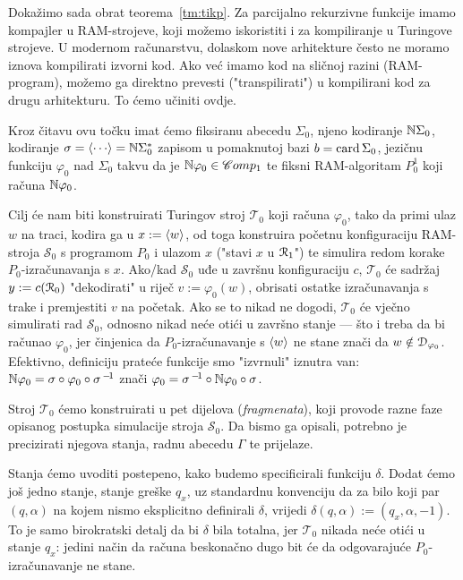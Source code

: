Dokažimo sada obrat teorema~\ref{tm:tikp}. Za parcijalno rekurzivne funkcije imamo kompajler u RAM-strojeve, koji možemo iskoristiti i za kompiliranje u Turingove strojeve. U modernom računarstvu, dolaskom nove arhitekture često ne moramo iznova kompilirati izvorni kod. Ako već imamo kod na sličnoj razini (RAM-program), možemo ga direktno prevesti ("transpilirati") u kompilirani kod za drugu arhitekturu. To ćemo učiniti ovdje.

Kroz čitavu ovu točku imat ćemo fiksiranu abecedu $\Sigma_0$, njeno kodiranje ${\mathbb N}\Sigma_0$, kodiranje $\sigma=\kr{\cdots}=\N\Sigma_0^*$ zapisom u pomaknutoj bazi $b=\operatorname{card}\Sigma_0$, jezičnu funkciju $\varphi_0$ nad $\Sigma_0$ takvu da je ${\mathbb N}\varphi_0\in\mathscr Comp_1$ te fiksni RAM-algoritam $P_0^1$ koji računa ${\mathbb N}\varphi_0$.

Cilj će nam biti konstruirati Turingov stroj $\mathcal T_0$ koji računa $\varphi_0$, tako da primi ulaz $w$ na traci, kodira ga u $x:=\langle w\rangle$, od toga konstruira početnu konfiguraciju RAM-stroja $\mathcal S_0$ s programom $P_0$ i ulazom $x$ ("\hspace{0.1pt}stavi $x$ u $\mathcal R_{1}$\!") te simulira redom korake $P_0$-izračunavanja s $x$. Ako\slash kad $\mathcal S_0$ uđe u završnu konfiguraciju $c$, $\mathcal T_0$ će sadržaj $y:=c(\mathcal R_{0})$ "dekodirati" u riječ $v:=\varphi_0(w)$, obrisati ostatke izračunavanja s trake i premjestiti $v$ na početak. Ako se to nikad ne dogodi, $\mathcal T_0$ će vječno simulirati rad $\mathcal S_0$, odnosno nikad neće otići u završno stanje --- što i treba da bi računao $\varphi_0$, jer činjenica da $P_0$-izračunavanje s $\langle w\rangle$ ne stane znači da $w\notin\mathcal D_{\varphi_0}$. Efektivno, definiciju prateće funkcije smo "izvrnuli" iznutra van: ${\mathbb N}\varphi_0=\sigma\circ\varphi_0\circ\sigma^{\,-\!1}$ znači $\varphi_0=\sigma^{\,-\!1}\circ{\mathbb N}\varphi_0\circ\sigma$.

Stroj $\mathcal T_0$ ćemo konstruirati u pet dijelova (\emph{fragmenata}), koji provode razne faze opisanog postupka simulacije stroja $\mathcal S_0$. Da bismo ga opisali, potrebno je precizirati njegova stanja, radnu abecedu $\Gamma$ te prijelaze.

Stanja ćemo uvoditi postepeno, kako budemo specificirali funkciju $\delta$. Dodat ćemo još jedno stanje, stanje greške $q_x$, uz standardnu konvenciju da za bilo koji par $(q,\alpha)$ na kojem nismo eksplicitno definirali $\delta$, vrijedi $\delta(q,\alpha):=(q_x,\alpha,-1)$. To je samo birokratski detalj da bi $\delta$ bila totalna, jer $\mathcal T_0$ nikada neće otići u stanje $q_x$: jedini način da računa beskonačno dugo bit će da odgovarajuće $P_0$-izračunavanje ne stane.

